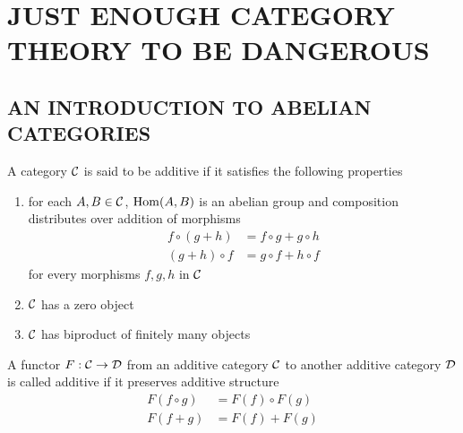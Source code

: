 \section{JUST ENOUGH CATEGORY THEORY TO BE DANGEROUS}

\subsection{AN INTRODUCTION TO ABELIAN CATEGORIES}

\begin{definition}
	A category $\mathcal{C}$ is said to be additive if it satisfies the following properties
	\begin{enumerate}
		\item for each $A, B \in \mathcal{C}$, $\operatorname{Hom}(A, B)$ is an abelian group and composition distributes over addition of morphisms
		\begin{align*}
			f \circ (g + h) &= f \circ g + g \circ h \\
			(g + h) \circ f &= g \circ f + h \circ f
		\end{align*}
		for every morphisms $f, g, h$ in $\mathcal{C}$
		
		\item $\mathcal{C}$ has a zero object
		
		\item $\mathcal{C}$ has biproduct of finitely many objects
	\end{enumerate}
	
	A functor $F: \mathcal{C} \to \mathcal{D}$ from an additive category $\mathcal{C}$ to another additive category $\mathcal{D}$ is called additive if it preserves additive structure
	\begin{align*}
		F(f \circ g) &= F(f) \circ F(g) \\
		F(f + g) &= F(f) + F(g)
	\end{align*}
\end{definition}

